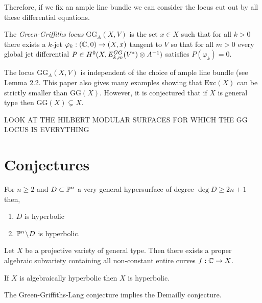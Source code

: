 \documentclass[12pt]{article}
\begin{document}
Therefore, if we fix an ample line bundle we can consider the locus cut out by all these differential equations.

\newcommand{\GG}{\mathrm{GG}}
\newcommand{\Exc}{\mathrm{Exc}}


\begin{defn}
The \textit{Green-Griffiths locus} $\GG_A(X, V)$ is the set $x \in X$ such that for all $k > 0$ there exists a $k$-jet $\varphi_k : (\CC, 0) \to (X, x)$ tangent to $V$ so that for all $m > 0$ every global jet differential $P \in H^0(X, E^{GG}_{k,m}(V^*) \ot A^{-1})$ satisfies $P(\varphi_k) = 0$.
\end{defn}

\begin{rmk}
The locus $\GG_A(X, V)$ is independent of the choice of ample line bundle (see  Lemma 2.2. This paper also gives many examples showing that $\Exc(X)$ can be strictly smaller than $\GG(X)$. However, it is conjectured that if $X$ is general type then $\GG(X) \subsetneq X$.
\end{rmk}


LOOK AT THE HILBERT MODULAR SURFACES FOR WHICH THE GG LOCUS IS EVERYTHING


\section{Conjectures}

\begin{conj}[Kobayashi]
For $n \ge 2$ and $D \subset \P^n$ a very general hypersurface of degree $\deg{D} \ge 2n + 1$ then,
\begin{enumerate}
\item $D$ is hyperbolic
\item $\P^n \sm D$ is hyperbolic.
\end{enumerate}
\end{conj}

\begin{conj}
Let $X$ be a projective variety of general type. Then there exists a proper algebraic subvariety containing all non-constant entire curves $f : \CC \to X$.
\end{conj}

\begin{conj}[Demailly]
If $X$ is algebraically hyperbolic then $X$ is hyperbolic.
\end{conj}

\begin{prop}
The Green-Griffiths-Lang conjecture implies the Demailly conjecture.
\end{prop}
\end{document}
